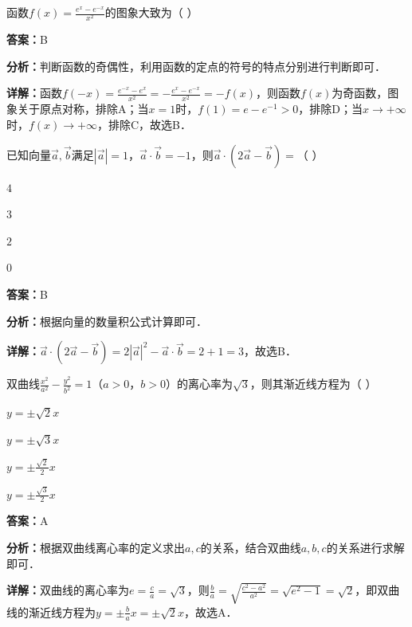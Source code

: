 \begin{question}[points=5]
函数$f(x)=\frac{e^x-e^{-x}}{x^2}$的图象大致为（      ）
\begin{choices}
  \item 
  \item 
  \item 
  \item 
\end{choices}
\begin{solution}
\textbf{答案：}B

\textbf{分析：}判断函数的奇偶性，利用函数的定点的符号的特点分别进行判断即可．

\textbf{详解：}函数$f(-x)=\frac{e^{-x}-e^x}{x^2}=-\frac{e^x-e^{-x}}{x^2}=-f(x)$，则函数$f(x)$为奇函数，图象关于原点对称，排除A；当$x=1$时，$f(1)=e-e^{-1}>0$，排除D；当$x\to +\infty$时，$f(x)\to +\infty$，排除C，故选B．
\end{solution}
\end{question}

\begin{question}[points=5]
已知向量$\vec{a},\vec{b}$满足$|\vec{a}|=1$，$\vec{a}\cdot\vec{b}=-1$，则$\vec{a}\cdot(2\vec{a}-\vec{b})=$（     ）
\begin{choices}
  \item $4$
  \item $3$
  \item $2$
  \item $0$
\end{choices}
\begin{solution}
\textbf{答案：}B

\textbf{分析：}根据向量的数量积公式计算即可．

\textbf{详解：}$\vec{a}\cdot(2\vec{a}-\vec{b})=2|\vec{a}|^2-\vec{a}\cdot\vec{b}=2+1=3$，故选B．
\end{solution}
\end{question}

\begin{question}[points=5]
双曲线$\frac{x^2}{a^2}-\frac{y^2}{b^2}=1$（$a>0$，$b>0$）的离心率为$\sqrt{3}$，则其渐近线方程为（     ）
\begin{choices}
  \item $y=\pm\sqrt{2}x$
  \item $y=\pm\sqrt{3}x$
  \item $y=\pm\frac{\sqrt{2}}{2}x$
  \item $y=\pm\frac{\sqrt{3}}{2}x$
\end{choices}
\begin{solution}
\textbf{答案：}A

\textbf{分析：}根据双曲线离心率的定义求出$a,c$的关系，结合双曲线$a,b,c$的关系进行求解即可．

\textbf{详解：}双曲线的离心率为$e=\frac{c}{a}=\sqrt{3}$，则$\frac{b}{a}=\sqrt{\frac{c^2-a^2}{a^2}}=\sqrt{e^2-1}=\sqrt{2}$，即双曲线的渐近线方程为$y=\pm\frac{b}{a}x=\pm\sqrt{2}x$，故选A．
\end{solution}
\end{question}

